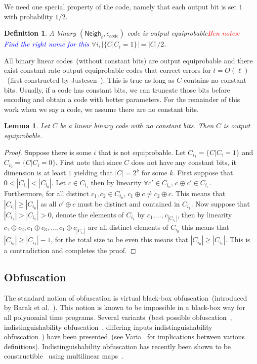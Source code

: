 \documentclass[11pt]{article}
\newcommand{\class}[1]{{\ensuremath{\mathsf{#1}}}}
\newcommand{\neigh}{\ensuremath{\class{Neigh}}\xspace}
\newtheorem{lemma}[theorem]{Lemma}
\newtheorem{definition}[theorem]{Definition}
\newcommand{\authnote}[2]{{\textcolor{red}{\textsf{#1 notes: }\textcolor{blue}{ #2}}\marginpar{\textcolor{red}{\textbf{!!!!!}}}}}
\newcommand{\authnote}[2]{}
\newcommand{\bnote}[1]{{\authnote{Ben}{#1}}}
\begin{document}
We need one special property of the code, namely that each output bit is set $1$ with probability $1/2$.

\begin{definition}
A binary $(\neigh_t, \epsilon_{code})$ code is output equiprobable\bnote{Find the right name for this} $\forall i, |\{C | C_i =1\}| =|C|/2$.
\end{definition}
All binary linear codes~(without constant bits) are output equiprobable and there exist constant rate output equiprobable codes that correct errors for $t = O(\ell)$~(first constructed by Justesen~\cite{justesen1972class}).  This is true as long as $C$ contains no constant bits.  Usually, if a code has constant bits, we can truncate those bits before encoding and obtain a code with better parameters.  For the remainder of this work when we say a code, we assume there are no constant bits.

\begin{lemma}
Let $C$ be a \emph{linear} binary code with no constant bits.  Then $C$ is output equiprobable.
\end{lemma}
\begin{proof}
Suppose there is some $i$ that is not equiprobable.  Let $C_{i_1} = \{C | C_i =1\}$ and $C_{i_0} = \{C | C_i = 0\}$. First note that since $C$ does not have any constant bits, it dimension is at least $1$ yielding that $|C| = 2^k$ for some $k$. First suppose that $0<|C_{i_1}| < |C_{i_0}|$.  Let $c\in C_{i_1}$ then by linearity $\forall c'\in C_{i_0}$, $c\oplus c' \in C_{i_1}$.  Furthermore, for all distinct $c_1, c_2\in C_{i_0}$, $c_1\oplus c \neq c_2\oplus c$.  This means that $|C_{i_i}|\geq |C_{i_0}|$ as all $c'\oplus c$ must be distinct and contained in $C_{i_1}$.  
Now suppose that $|C_{i_1}| > |C_{i_0}| >0$, denote the elements of $C_{i_1}$ by $c_1,..., c_{|C_{i_1}|}$, then by linearity $c_1\oplus c_2, c_1\oplus c_3,..., c_1\oplus c_{|C_{i_1}|}$ are all distinct elements of $C_{i_0}$ this means that $|C_{i_0}|\geq |C_{i_1}| -1 $, for the total size to be even this means that $|C_{i_0}|\geq |C_{i_1}|$.  This is a contradiction and completes the proof.
\end{proof}



\subsection{Obfuscation}
The standard notion of obfuscation is virtual black-box obfuscation~(introduced by Barak et al.~\cite{barak2001possibility}).  This notion is known to be impossible in a black-box way for all polynomial time programs.  Several variants~(best possible obfuscation~\cite{goldwasser2007best}, indistinguishability obfuscation~\cite{barak2001possibility}, differing inputs indistinguishability obfuscation~\cite{barak2001possibility}) have been presented~(see Varia~\cite{varia2010studies} for implications between various definitions).  Indistinguishability obfuscation has recently been shown to be constructible~\cite{garg2013candidate} using multilinear maps~\cite{garg2013multilinear}.
\end{document}
